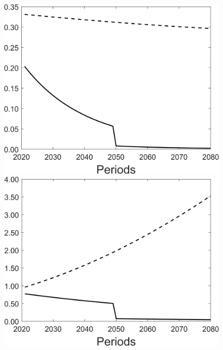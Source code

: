 \begin{figure}[h!!]
\begin{minipage}[]{0.32\textwidth}
	\end{minipage}
	\begin{minipage}[]{0.32\textwidth}
		\includegraphics[width=1\textwidth]{../../codding_model/Own/figures/Rep_agent/staticRam_LF_separate_hl_periods59_eppsilon0.40_zeta1.40_Ad08_Ac04_thetac0.70_thetad0.56_HetGrowth1_tauul0.181_util0_withtarget1_lgd0.png}
	\end{minipage}
	\begin{minipage}[]{0.32\textwidth}
		\includegraphics[width=1\textwidth]{../../codding_model/Own/figures/Rep_agent/staticRam_LF_separate_yc_periods59_eppsilon0.40_zeta1.40_Ad08_Ac04_thetac0.70_thetad0.56_HetGrowth1_tauul0.181_util0_withtarget1_lgd0.png}

\end{minipage}
\end{figure}
